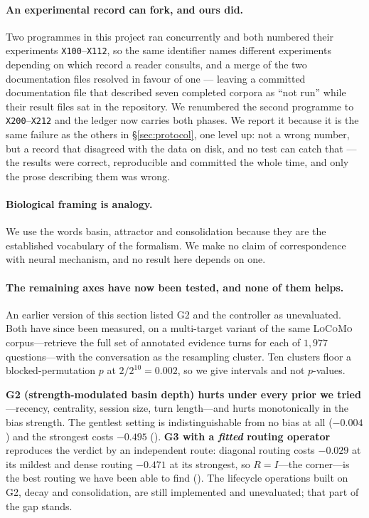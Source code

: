 \paragraph{An experimental record can fork, and ours did.} Two programmes in this project
ran concurrently and both numbered their experiments \texttt{X100}--\texttt{X112}, so the
same identifier names different experiments depending on which record a reader consults, and
a merge of the two documentation files resolved in favour of one --- leaving a committed
documentation file that described seven completed corpora as ``not run'' while their result
files sat in the repository. We renumbered the second programme to \texttt{X200}--\texttt{X212}
and the ledger now carries both phases. We report it because it is the same failure as the
others in \S\ref{sec:protocol}, one level up: not a wrong number, but a record that
disagreed with the data on disk, and no test can catch that --- the results were correct,
reproducible and committed the whole time, and only the prose describing them was wrong.

\paragraph{Biological framing is analogy.} We use the words basin, attractor and
consolidation because they are the established vocabulary of the formalism. We make no claim
of correspondence with neural mechanism, and no result here depends on one.

\paragraph{The remaining axes have now been tested, and none of them helps.} An earlier
version of this section listed G2 and the controller as unevaluated. Both have since been
measured, on a multi-target variant of the same \textsc{LoCoMo} corpus---retrieve the full
set of annotated evidence turns for each of $1{,}977$ questions---with the conversation as
the resampling cluster. Ten clusters floor a blocked-permutation $p$ at $2/2^{10} = 0.002$,
so we give intervals and not $p$-values.

\textbf{G2 (strength-modulated basin depth) hurts under every prior we tried}---recency,
centrality, session size, turn length---and hurts monotonically in the bias strength. The
gentlest setting is indistinguishable from no bias at all ($-0.004$ )
and the strongest costs $-0.495$  (). \textbf{G3 with a
\emph{fitted} routing operator} reproduces the  verdict by an independent route:
diagonal routing costs $-0.029$  at its mildest and dense routing
$-0.471$  at its strongest, so $R{=}I$---the corner---is the best
routing we have been able to find (). The lifecycle operations built on G2, decay
and consolidation, are still implemented and unevaluated; that part of the gap stands.

